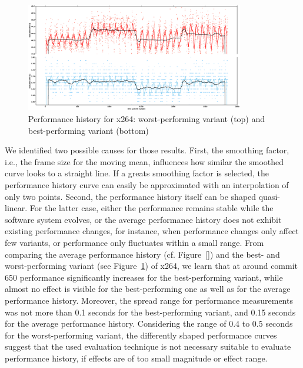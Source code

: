 \begin{figure}[t!]
\centering
\includegraphics[width=0.85\textwidth]{images/x264_best_worst.eps}
\caption{Performance history for x264: worst-performing variant (top) and
best-performing variant (bottom)}
\label{fig:x264_worstbest}
\end{figure}

We identified two possible causes for those results. First, the smoothing
factor, i.e., the frame size for the moving mean, influences how similar the
smoothed curve looks to a straight line. If a greats smoothing factor is
selected, the performance history curve can easily be approximated with an
interpolation of only two points. Second, the performance history itself can be
shaped quasi-linear. For the latter case, either the performance remains stable
while the software system evolves, or the average performance history does not
exhibit existing performance changes, for instance, when performance changes
only affect few variants, or performance only fluctuates within a small range.
From comparing the average performance history (cf. Figure~\ref{}) and the
best- and worst-performing variant (see Figure~\ref{fig:x264_worstbest}) of
x264, we learn that at around commit 650 performance significantly increases for the
best-performing variant, while almost no effect is visible for the
best-performing one as well as for the average performance history. Moreover,
the spread range for performance measurements was not more than 0.1 seconds for
the best-performing variant, and 0.15 seconds for the average performance
history. Considering the range of 0.4 to 0.5 seconds for the worst-performing
variant, the differently shaped performance curves suggest that the used
evaluation technique is not necessary suitable to evaluate performance history,
if effects are of too small magnitude or effect range.

